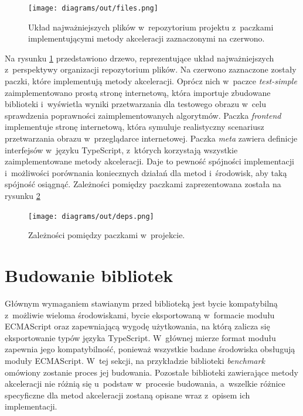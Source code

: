 \begin{figure}[ht]
    \centering
    \texttt{[image: diagrams/out/files.png]}
    \caption{Układ najważniejszych plików w~repozytorium projektu z~paczkami implementującymi metody akceleracji zaznaczonymi na czerwono.}
    \label{fig:files}
\end{figure}

Na rysunku \ref{fig:files} przedstawiono drzewo, reprezentujące układ najważniejszych z~perspektywy organizacji repozytorium plików. Na czerwono zaznaczone zostały paczki, które implementują metody akceleracji. Oprócz nich w~paczce \textit{test-simple} zaimplementowano prostą stronę internetową, która importuje zbudowane biblioteki i~wyświetla wyniki przetwarzania dla testowego obrazu w~celu sprawdzenia poprawności zaimplementowanych algorytmów. Paczka \textit{frontend} implementuje stronę internetową, która symuluje realistyczny scenariusz przetwarzania obrazu w~przeglądarce internetowej. Paczka \textit{meta} zawiera definicje interfejsów w~języku TypeScript, z~których korzystają wszystkie zaimplementowane metody akceleracji. Daje to pewność spójności implementacji i~możliwości porównania koniecznych działań dla metod i~środowisk, aby taką spójność osiągnąć. Zależności pomiędzy paczkami zaprezentowana została na rysunku \ref{fig:deps}

\begin{figure}[ht]
    \centering
    \texttt{[image: diagrams/out/deps.png]}
    \caption{Zależności pomiędzy paczkami w~projekcie.}
    \label{fig:deps}
\end{figure}

\section{Budowanie bibliotek}

Głównym wymaganiem stawianym przed biblioteką jest bycie kompatybilną z~możliwie wieloma środowiskami, bycie eksportowaną w~formacie modułu ECMAScript oraz zapewniającą wygodę użytkowania, na którą zalicza się eksportowanie typów języka TypeScript. W~głównej mierze format modułu zapewnia jego kompatybilność, ponieważ wszystkie badane środowiska obsługują moduły ECMAScript. W~tej sekcji, na przykładzie biblioteki \textit{benchmark} omówiony zostanie proces jej budowania. Pozostałe biblioteki zawierające metody akceleracji nie różnią się u~podstaw w~procesie budowania, a~wszelkie różnice specyficzne dla metod akceleracji zostaną opisane wraz z~opisem ich implementacji.

